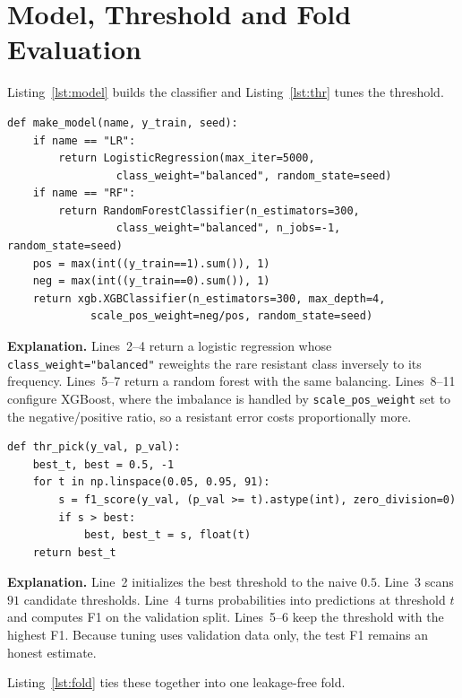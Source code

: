 \documentclass[../main.tex]{subfiles}
\begin{document}
\section{Model, Threshold and Fold Evaluation}

Listing~\ref{lst:model} builds the classifier and Listing~\ref{lst:thr} tunes the threshold.

\begin{lstlisting}[caption={Model factory.},label=lst:model]
def make_model(name, y_train, seed):
    if name == "LR":
        return LogisticRegression(max_iter=5000,
                 class_weight="balanced", random_state=seed)
    if name == "RF":
        return RandomForestClassifier(n_estimators=300,
                 class_weight="balanced", n_jobs=-1, random_state=seed)
    pos = max(int((y_train==1).sum()), 1)
    neg = max(int((y_train==0).sum()), 1)
    return xgb.XGBClassifier(n_estimators=300, max_depth=4,
             scale_pos_weight=neg/pos, random_state=seed)
\end{lstlisting}

\noindent\textbf{Explanation.} Lines~2--4 return a logistic regression whose \texttt{class\_weight="balanced"} reweights the rare resistant class inversely to its frequency. Lines~5--7 return a random forest with the same balancing. Lines~8--11 configure XGBoost, where the imbalance is handled by \texttt{scale\_pos\_weight} set to the negative/positive ratio, so a resistant error costs proportionally more.

\begin{lstlisting}[caption={Threshold tuning by F1.},label=lst:thr]
def thr_pick(y_val, p_val):
    best_t, best = 0.5, -1
    for t in np.linspace(0.05, 0.95, 91):
        s = f1_score(y_val, (p_val >= t).astype(int), zero_division=0)
        if s > best:
            best, best_t = s, float(t)
    return best_t
\end{lstlisting}

\noindent\textbf{Explanation.} Line~2 initializes the best threshold to the naive $0.5$. Line~3 scans $91$ candidate thresholds. Line~4 turns probabilities into predictions at threshold $t$ and computes F1 on the validation split. Lines~5--6 keep the threshold with the highest F1. Because tuning uses validation data only, the test F1 remains an honest estimate.

Listing~\ref{lst:fold} ties these together into one leakage-free fold.
\end{document}

